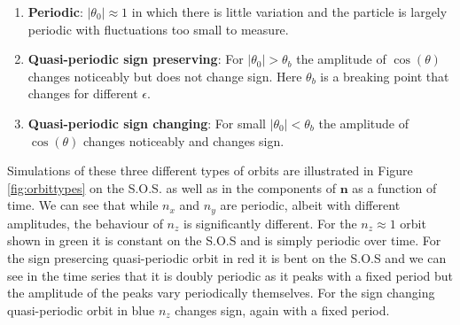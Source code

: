 \begin{enumerate}
\item \textbf{Periodic}: $\left|\theta_0\right| \approx 1$ in which there is little variation and the particle is largely periodic with fluctuations too small to measure.
\item \textbf{Quasi-periodic sign preserving}: For $\left|\theta_0\right|> \theta_b$ the amplitude of $\cos(\theta)$ changes noticeably but does not change sign. Here $\theta_b$ is a breaking point that changes for different $\epsilon$.
\item \textbf{Quasi-periodic sign changing}: For small $\left|\theta_0\right| < \theta_b$ the amplitude of $\cos(\theta)$ changes noticeably and changes sign. 
\end{enumerate}

Simulations of these three different types of orbits are illustrated in Figure \ref{fig:orbittypes} on the S.O.S. as well as in the components of $\mathbf{n}$ as a function of time. We can see that while $n_x$ and $n_y$ are periodic, albeit with different amplitudes, the  behaviour of $n_z$ is significantly different. For the $n_z \approx 1$  orbit shown in green it is constant on the S.O.S and is simply periodic over time. For the sign presercing quasi-periodic orbit in red it is bent on the S.O.S and we can see in the time series that it is doubly periodic as it peaks with a fixed period but the amplitude of the peaks vary periodically themselves. For the sign changing quasi-periodic orbit in blue $n_z$ changes sign, again with a fixed period.


